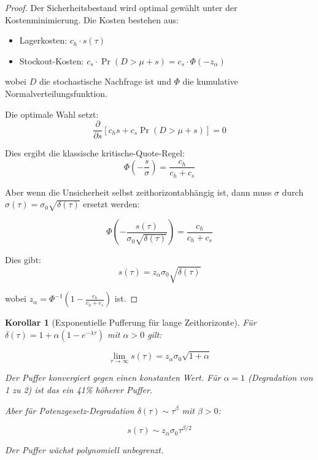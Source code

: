 \documentclass[12pt, a4paper, titlepage]{report}
\newtheorem{corollary}[theorem]{Korollar}
\theoremstyle{definition}
\theoremstyle{remark}
\begin{document}
\begin{proof}
Der Sicherheitsbestand wird optimal gewählt unter der Kostenminimierung. Die Kosten bestehen aus:
\begin{itemize}
  \item Lagerkosten: $c_h \cdot s(\tau)$
  \item Stockout-Kosten: $c_s \cdot \Pr(D > \mu + s) = c_s \cdot \Phi(-z_\alpha)$
\end{itemize}

wobei $D$ die stochastische Nachfrage ist und $\Phi$ die kumulative Normalverteilungsfunktion.

Die optimale Wahl setzt:
\begin{equation}
\frac{\partial}{\partial s} \left[ c_h s + c_s \Pr(D > \mu + s) \right] = 0
\end{equation}

Dies ergibt die klassische kritische-Quote-Regel:
\begin{equation}
\Phi\left(-\frac{s}{\sigma}\right) = \frac{c_h}{c_h + c_s}
\end{equation}

Aber wenn die Unsicherheit selbst zeithorizontabhängig ist, dann muss $\sigma$ durch $\sigma(\tau) = \sigma_0 \sqrt{\delta(\tau)}$ ersetzt werden:

\begin{equation}
\Phi\left(-\frac{s(\tau)}{\sigma_0\sqrt{\delta(\tau)}}\right) = \frac{c_h}{c_h + c_s}
\end{equation}

Dies gibt:
\begin{equation}
s(\tau) = z_\alpha \sigma_0 \sqrt{\delta(\tau)}
\end{equation}

wobei $z_\alpha = \Phi^{-1}(1 - \frac{c_h}{c_h + c_s})$ ist.
\end{proof}

\begin{corollary}[Exponentielle Pufferung für lange Zeithorizonte]
Für $\delta(\tau) = 1 + \alpha(1 - e^{-\lambda\tau})$ mit $\alpha > 0$ gilt:

\begin{equation}
\lim_{\tau \to \infty} s(\tau) = z_\alpha \sigma_0 \sqrt{1 + \alpha}
\end{equation}

Der Puffer konvergiert gegen einen konstanten Wert. Für $\alpha = 1$ (Degradation von 1 zu 2) ist das ein 41\% höherer Puffer.

Aber für Potenzgesetz-Degradation $\delta(\tau) \sim \tau^\beta$ mit $\beta > 0$:

\begin{equation}
s(\tau) \sim z_\alpha \sigma_0 \tau^{\beta/2}
\end{equation}

Der Puffer wächst polynomiell unbegrenzt.
\end{corollary}
\end{document}
